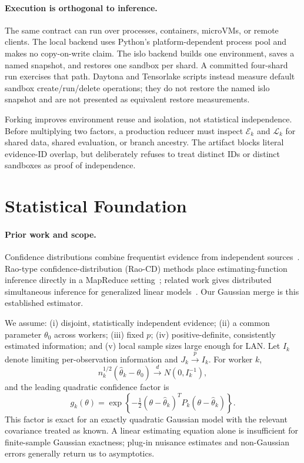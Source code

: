 \paragraph{Execution is orthogonal to inference.} The same contract can run over processes, containers, microVMs, or remote clients. The local backend uses Python's platform-dependent process pool and makes no copy-on-write claim. The islo backend builds one environment, saves a named snapshot, and restores one sandbox per shard. A committed four-shard run exercises that path. Daytona and Tensorlake scripts instead measure default sandbox create/run/delete operations; they do not restore the named islo snapshot and are not presented as equivalent restore measurements.

Forking improves environment reuse and isolation, not statistical independence. Before multiplying two factors, a production reducer must inspect $\mathcal E_k$ and $\mathcal L_k$ for shared data, shared evaluation, or branch ancestry. The artifact blocks literal evidence-ID overlap, but deliberately refuses to treat distinct IDs or distinct sandboxes as proof of independence.

\section{Statistical Foundation}
\label{sec:boltzmann}

\paragraph{Prior work and scope.} Confidence distributions combine frequentist evidence from independent sources~\cite{singh2005combining,xie2013confidence}. Rao-type confidence-distribution (Rao-CD) methods place estimating-function inference directly in a MapReduce setting~\cite{zhou2017raocd}; related work gives distributed simultaneous inference for generalized linear models~\cite{tang2020distributed}. Our Gaussian merge is this established estimator.

We assume: (i) disjoint, statistically independent evidence; (ii) a common parameter $\theta_0$ across workers; (iii) fixed $p$; (iv) positive-definite, consistently estimated information; and (v) local sample sizes large enough for LAN. Let $I_k$ denote limiting per-observation information and $J_k\overset{p}{\to}I_k$. For worker $k$,
\begin{equation}
n_k^{1/2}(\hat\theta_k-\theta_0)
\overset{d}{\longrightarrow}N(0,I_k^{-1}),
\label{eq:lan}
\end{equation}
and the leading quadratic confidence factor is
\begin{equation}
g_k(\theta)=\exp\!\left\{-\tfrac12
(\theta-\hat\theta_k)^TP_k(\theta-\hat\theta_k)\right\}.
\label{eq:factor}
\end{equation}
This factor is exact for an exactly quadratic Gaussian model with the relevant covariance treated as known. A linear estimating equation alone is insufficient for finite-sample Gaussian exactness; plug-in nuisance estimates and non-Gaussian errors generally return us to asymptotics.

